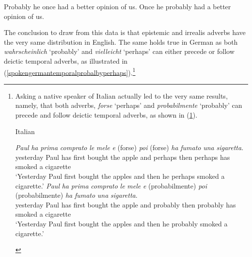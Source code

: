 \begin{exe}
\ex\label{cinuqeenglishdatairrealiscc}\begin{xlist}
\ex Probably he once had a better opinion of us.
\ex Once he probably had a better opinion of us.
\end{xlist}
\end{exe}

\noindent The conclusion to draw from this data is that epistemic and irrealis adverbs have the very same distribution in English. The same holds true in German as both \textit{wahrscheinlich} `probably' and \textit{vielleicht} `perhaps' can either precede or follow deictic temporal adverbs, as illustrated in (\ref{spokengermantemporalprobalbyperhaps}).\footnote{ Asking a native speaker of Italian actually led to the very same results, namely, that both adverbs, \textit{forse} `perhaps' and \textit{probabilmente} `probably' can precede and follow deictic temporal adverbs, as shown in (\ref{italianforseperhaps}).

\begin{exe}
\ex Italian \label{italianforseperhaps}\begin{xlist} 
\ex {} {\textit{Paul}} {\textit{ha}} {\textit{prima}} {\textit{comprato}} {\textit{le}} {\textit{mele}} {\textit{e}} {(forse)} {\textit{poi}} {(forse)} {\textit{ha}} {\textit{fumato}} {\textit{una}} {\textit{sigaretta}}.\\
{yesterday} {Paul} {has} {first} {bought} {the} {apple} {and} {perhaps} {then} {perhaps} {has} {smoked} {a} {cigarette}\\ 
\trans `Yesterday Paul first bought the apples and then he perhaps smoked a cigarette.' \label{italianforseperhapsa}
\ex {} {\textit{Paul}} {\textit{ha}} {\textit{prima}} {\textit{comprato}} {\textit{le}} {\textit{mele}} {\textit{e}} {(probabilmente)} {\textit{poi}} {(probabilmente)} {\textit{ha}} {\textit{fumato}} {\textit{una}} {\textit{sigaretta}}.\\
{yesterday} {Paul} {has} {first} {bought} {the} {apple} {and} {probably} {then} {probably} {has} {smoked} {a} {cigarette}\\ 
\trans `Yesterday Paul first bought the apples and then he probably smoked a cigarette.' \label{italianforseperhapsb}

\end{xlist}
\end{exe}

}

